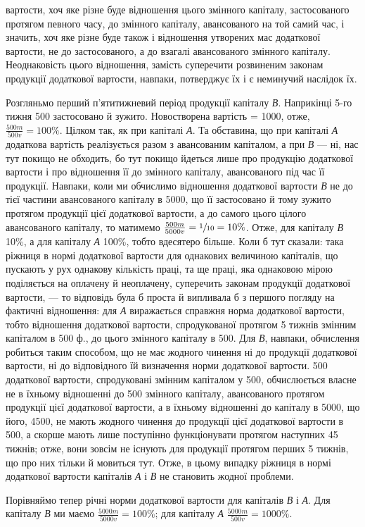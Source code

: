 \parcont{}  %
вартости, хоч яке різне буде відношення цього змінного капіталу, застосованого
протягом певного часу, до змінного капіталу, авансованого на
той самий час, і значить, хоч яке різне буде також і відношення утворених
мас додаткової вартости, не до застосованого, а до взагалі авансованого
змінного капіталу. Неоднаковість цього відношення, замість суперечити
розвиненим законам продукції додаткової вартости, навпаки,
потверджує їх і є неминучий наслідок їх.

Розгляньмо перший п’ятитижневий період продукції капіталу \emph{В}. Наприкінці
5-го тижня 500 застосовано й зужито. Новостворена
вартість = 1000, отже, $\frac{500m}{500v}=100\%$. Цілком так, як при капіталі \emph{А}.
Та обставина, що при капіталі \emph{А} додаткова вартість реалізується разом з
авансованим капіталом, а при \emph{В} — ні, нас тут покищо не обходить, бо
тут покищо йдеться лише про продукцію додаткової вартости і про
відношення її до змінного капіталу, авансованого під час її продукції.
Навпаки, коли ми обчислимо відношення додаткової вартости \emph{В} не
до тієї частини авансованого капіталу в 5000, що її застосовано й
тому зужито протягом продукції цієї додаткової вартости, а до самого
цього цілого авансованого капіталу, то матимемо $\frac{500m}{5000v} = \sfrac{1}{10} = 10\%$.
Отже, для капіталу \emph{В} 10\%, а для капіталу \emph{А} 100\%, тобто вдесятеро
більше. Коли б тут сказали: така ріжниця в нормі додаткової вартости
для однакових величиною капіталів, що пускають у рух однакову кількість
праці, та ще праці, яка однаковою мірою поділяється на оплачену й
неоплачену, суперечить законам продукції додаткової вартости, — то
відповідь була б проста й випливала б з першого погляду на фактичні
відношення: для \emph{А} виражається справжня норма додаткової вартости,
тобто відношення додаткової вартости, спродукованої протягом 5 тижнів
змінним капіталом в 500 ф., до цього змінного капіталу в 500.
Для \emph{В}, навпаки, обчислення робиться таким способом, що не має жодного
чинення ні до продукції додаткової вартости, ні до відповідного їй
визначення норми додаткової вартости. 500 додаткової вартости,
спродуковані змінним капіталом у 500, обчислюється
власне не в їхньому відношенні до 500 змінного капіталу, авансованого
протягом продукції цієї додаткової вартости, а в їхньому відношенні
до капіталу в 5000, що  його, 4500, не мають
жодного чинення до продукції цієї додаткової вартости в 500, а
скорше мають лише поступінно функціонувати протягом наступних 45 тижнів;
отже, вони зовсім не існують для продукції протягом перших 5 тижнів,
що про них тільки й мовиться тут. Отже, в цьому випадку ріжниця
в нормі додаткової вартости капіталів \emph{А} і \emph{В} не становить жодної
проблеми.

Порівняймо тепер річні норми додаткової вартости для капіталів \emph{В} і \emph{А}.
Для капіталу \emph{В} ми маємо $\frac{5000m}{5000v} = 100\%$;
для капіталу \emph{А} $\frac{5000m}{500v} = 1000\%$.
\parbreak{}  %
